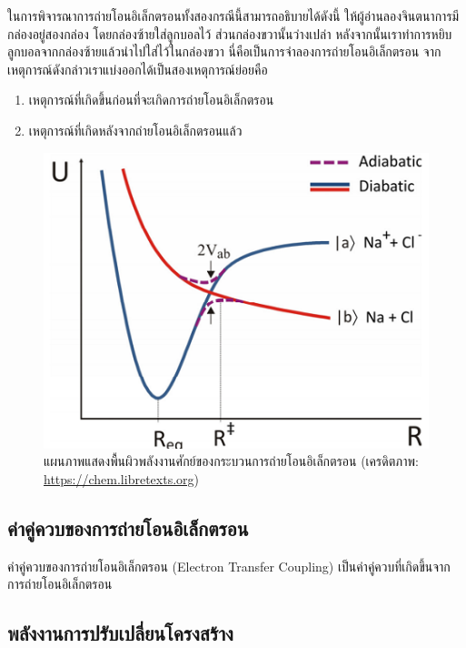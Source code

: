 ในการพิจารณาการถ่ายโอนอิเล็กตรอนทั้งสองกรณีนี้สามารถอธิบายได้ดังนี้ ให้ผู้อ่านลองจินตนาการมีกล่องอยู่สองกล่อง โดยกล่องซ้ายใส่ลูกบอลไว้ 
ส่วนกล่องขวานั้นว่างเปล่า หลังจากนั้นเราทำการหยิบลูกบอลจากกล่องซ้ายแล้วนำไปใส่ไว้ในกล่องขวา นี่คือเป็นการจำลองการถ่ายโอนอิเล็กตรอน 
จากเหตุการณ์ดังกล่าวเราแบ่งออกได้เป็นสองเหตุการณ์ย่อยคือ

\begin{enumerate}
    \item เหตุการณ์ที่เกิดขึ้นก่อนที่จะเกิดการถ่ายโอนอิเล็กตรอน
    
    \item เหตุการณ์ที่เกิดหลังจากถ่ายโอนอิเล็กตรอนแล้ว
\end{enumerate}

\begin{figure}[htbp]
    \centering
    \includegraphics[width=0.7\linewidth]{fig/et_diagram.png}
    \caption{แผนภาพแสดงพื้นผิวพลังงานศักย์ของกระบวนการถ่ายโอนอิเล็กตรอน (เครดิตภาพ: \url{https://chem.libretexts.org})}
    \label{fig:et_diagram}
\end{figure}

\subsection{ค่าคู่ควบของการถ่ายโอนอิเล็กตรอน}
\label{ssec:et_coupling}

ค่าคู่ควบของการถ่ายโอนอิเล็กตรอน (Electron Transfer Coupling) เป็นค่าคู่ควบที่เกิดขึ้นจากการถ่ายโอนอิเล็กตรอน

\subsection{พลังงานการปรับเปลี่ยนโครงสร้าง}
\label{ssec:reor_ener}

